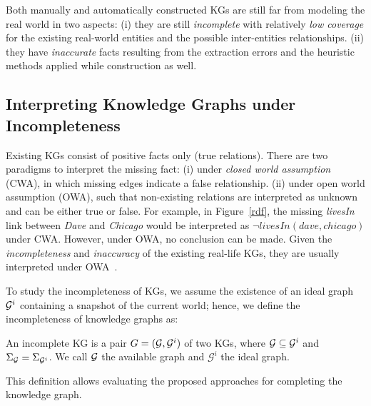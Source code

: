

Both manually and automatically constructed KGs are still far from modeling the real world in two aspects: (i) they are still \textit{incomplete} with relatively \textit{low coverage} for the existing real-world entities and the possible inter-entities relationships. (ii) they have \textit{inaccurate} facts resulting from the extraction errors and the heuristic methods applied while construction as well.  



\subsection{Interpreting Knowledge Graphs under Incompleteness}

Existing KGs consist of positive facts only (\ie true relations). There are two paradigms to interpret the missing fact: (i) under \textit{closed world assumption} (CWA), in which missing edges indicate a false relationship. (ii) under open world assumption (OWA), such that non-existing relations are interpreted as unknown and can be either true or false. For example, in Figure~\ref{rdf}, the missing \textit{livesIn} link between \textit{Dave} and \textit{Chicago} would be interpreted as $\neg livesIn(dave, chicago)$ under CWA. However, under OWA, no conclusion can be made. Given the \textit{incompleteness} and \textit{inaccuracy} of the existing real-life KGs, they are usually interpreted under OWA~\cite{Nickel2015ARO}. 

To study the incompleteness of KGs, we assume the existence of an ideal graph $\mathcal{G}^i$ containing a snapshot of the current world; hence, we define the incompleteness of knowledge graphs as:

\begin{definition} An incomplete KG is a pair
    $G = (\mathcal{G}, \mathcal{G}^i)$ of two KGs, where $\mathcal{G}\subseteq \mathcal{G}^i$ and
    $\Sigma_{\mathcal{G}}=\Sigma_{\mathcal{G}^i}$. We call $\mathcal{G}$ the available
    graph and $\mathcal{G}^i$ the ideal graph.  \end{definition}
    
This definition allows evaluating the proposed approaches for completing the knowledge graph.  

